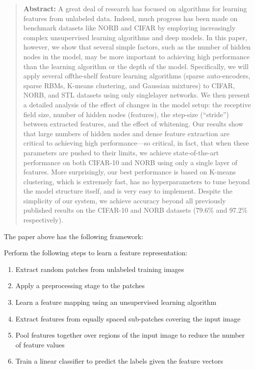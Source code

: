 \documentclass[onecolumn, letterpaper, 12pt]{report}
\begin{document}
\begin{quote}
  \textbf{Abstract: } A great deal of research has focused on
  algorithms for learning features from unlabeled data. Indeed, much
  progress has been made on benchmark datasets like NORB and CIFAR by
  employing increasingly complex unsupervised learning algorithms and
  deep models. In this paper, however, we show that several simple
  factors, such as the number of hidden nodes in the model, may be
  more important to achieving high performance than the learning
  algorithm or the depth of the model. Specifically, we will apply
  several offthe-shelf feature learning algorithms (sparse
  auto-encoders, sparse RBMs, K-means clustering, and Gaussian
  mixtures) to CIFAR, NORB, and STL datasets using only singlelayer
  networks. We then present a detailed analysis of the effect of
  changes in the model setup: the receptive field size, number of
  hidden nodes (features), the step-size (“stride”) between extracted
  features, and the effect of whitening. Our results show that large
  numbers of hidden nodes and dense feature extraction are critical to
  achieving high performance—so critical, in fact, that when these
  parameters are pushed to their limits, we achieve state-of-the-art
  performance on both CIFAR-10 and NORB using only a single layer of
  features. More surprisingly, our best performance is based on
  K-means clustering, which is extremely fast, has no hyperparameters
  to tune beyond the model structure itself, and is very easy to
  implement. Despite the simplicity of our system, we achieve accuracy
  beyond all previously published results on the CIFAR-10 and NORB
  datasets (79.6\% and 97.2\% respectively).
\end{quote}

The paper above has the following framework: 

Perform the following steps to learn a feature representation: 

\begin{enumerate}
\item Extract random patches from unlabeled training images
\item Apply a preprocessing stage to the patches
\item Learn a feature mapping using an unsupervised learning algorithm
\item Extract features from equally spaced sub-patches covering the input image
\item Pool features together over regions of the input image to reduce the number of feature values
\item Train a linear classifier to predict the labels given the feature vectors
\end{enumerate}
\end{document}
